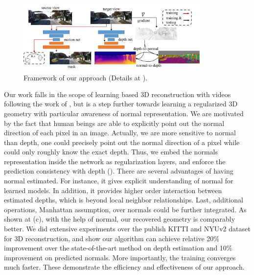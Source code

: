 \begin{figure}[t]
\centering
\includegraphics[width=0.85\textwidth]{figures/pipeline_comp.pdf}
\caption{Framework of our approach (Details at ).}
\label{fig:pipeline}
\vspace{-1.3\baselineskip}
\end{figure}
Our work falls in the scope of learning based 3D reconstruction with videos following the work of \cite{zhou2017unsupervised}, but is a step further towards learning a regularized 3D geometry with particular awareness of normal representation. 
We are motivated by the fact that human beings are able to explicitly point out the normal direction of each pixel in an image. Actually, we are more sensitive to normal than depth, \eg one could precisely point out the normal direction of a pixel while could only roughly know the exact depth. 
Thus, we embed the normals representation inside the network as regularization layers, and enforce the prediction consistency with depth ().
There are several advantages of having normal estimated. For instance, it gives explicit understanding of normal for learned models.  In addition, it provides higher order interaction between estimated depths, which is beyond local neighbor relationships. Last, additional operations, \eg Manhattan assumption, over normals could be further integrated.
As shown at (c), with the help of normal, our recovered geometry is comparably better. We did extensive experiments over the publish KITTI and NYUv2 dataset for 3D reconstruction, and show our algorithm can achieve relative 20$\%$ improvement over the state-of-the-art method on depth estimation and 10$\%$ improvement on predicted normals. More importantly, the training converges much faster. These demonstrate the efficiency and effectiveness of our approach.

